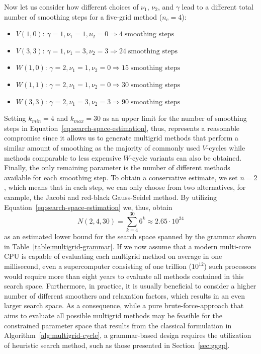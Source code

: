 Now let us consider how different choices of $\nu_1$, $\nu_2$, and $\gamma$ lead to a different total number of smoothing steps for a five-grid method ($n_c = 4$):
\begin{itemize}
	\item $V(1,0)$: $\gamma = 1, \nu_1 = 1, \nu_2 = 0 \Rightarrow 4 \; \text{smoothing steps}$
	\item $V(3,3)$: $\gamma = 1, \nu_1 = 3, \nu_2 = 3 \Rightarrow 24 \; \text{smoothing steps}$
	\item $W(1,0)$: $\gamma = 2, \nu_1 = 1, \nu_2 = 0 \Rightarrow 15 \; \text{smoothing steps}$
	\item $W(1,1)$: $\gamma = 2, \nu_1 = 1, \nu_2 = 0 \Rightarrow 30 \; \text{smoothing steps}$
	\item $W(3,3)$: $\gamma = 2, \nu_1 = 3, \nu_2 = 3 \Rightarrow 90 \; \text{smoothing steps}$
\end{itemize}
Setting $k_{min} = 4$ and $k_{max} = 30$ as an upper limit for the number of smoothing steps in Equation~\eqref{eq:search-space-estimation}, thus, represents a reasonable compromise since it allows us to generate multigrid methods that perform a similar amount of smoothing as the majority of commonly used $V$-cycles while methods comparable to less expensive $W$-cycle variants can also be obtained.
Finally, the only remaining parameter is the number of different methods available for each smoothing step.
To obtain a conservative estimate, we set $n = 2$, which means that in each step, we can only choose from two alternatives, for example, the Jacobi and red-black Gauss-Seidel method.
By utilizing Equation~\eqref{eq:search-space-estimation} we, thus, obtain 
\begin{equation*}
	N(2, 4, 30) = \sum_{k = 4}^{30} 6^k \approx 2.65 \cdot 10^{24}
\end{equation*}
as an estimated lower bound for the search space spanned by the grammar shown in Table~\ref{table:multigrid-grammar}.
If we now assume that a modern multi-core CPU is capable of evaluating each multigrid method on average in one millisecond,
even a supercomputer consisting of one trillion ($10^{12}$) such processors would require more than eight years to evaluate all methods contained in this search space.
Furthermore, in practice, it is usually beneficial to consider a higher number of different smoothers and relaxation factors, which results in an even larger search space.
As a consequence, while a pure brute-force-approach that aims to evaluate all possible multigrid methods may be feasible for the constrained parameter space that results from the classical formulation in Algorithm~\ref{alg:multigrid-cycle}, a grammar-based design requires the utilization of heuristic search method, such as those presented in Section~\ref{sec:gggp}.

